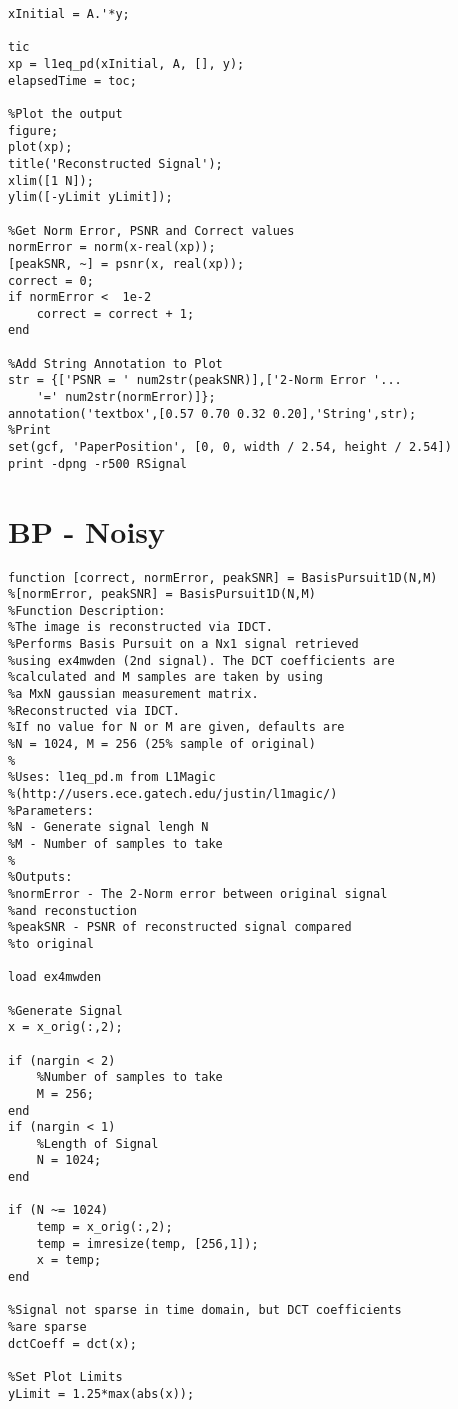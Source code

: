 \documentclass[titlepage,oneside, 12pt]{book}
\theoremstyle{break}
\begin{document}
\begin{appendices}
\begin{lstlisting}[label={lst:ex1D}]
%Do CS Recovery via l1 minimization.
xInitial = A.'*y; 

tic
xp = l1eq_pd(xInitial, A, [], y);
elapsedTime = toc;

%Plot the output
figure; 
plot(xp); 
title('Reconstructed Signal'); 
xlim([1 N]); 
ylim([-yLimit yLimit]);

%Get Norm Error, PSNR and Correct values
normError = norm(x-real(xp)); 
[peakSNR, ~] = psnr(x, real(xp));
correct = 0;
if normError <  1e-2
    correct = correct + 1;
end
    
%Add String Annotation to Plot
str = {['PSNR = ' num2str(peakSNR)],['2-Norm Error '...
    '=' num2str(normError)]}; 
annotation('textbox',[0.57 0.70 0.32 0.20],'String',str);
%Print
set(gcf, 'PaperPosition', [0, 0, width / 2.54, height / 2.54])
print -dpng -r500 RSignal
\end{lstlisting}

\chapter{BP - Noisy}
\begin{lstlisting}[label={lst:ex1DNoise}]
function [correct, normError, peakSNR] = BasisPursuit1D(N,M)
%[normError, peakSNR] = BasisPursuit1D(N,M)
%Function Description: 
%The image is reconstructed via IDCT.
%Performs Basis Pursuit on a Nx1 signal retrieved
%using ex4mwden (2nd signal). The DCT coefficients are
%calculated and M samples are taken by using 
%a MxN gaussian measurement matrix. 
%Reconstructed via IDCT. 
%If no value for N or M are given, defaults are
%N = 1024, M = 256 (25% sample of original)
%
%Uses: l1eq_pd.m from L1Magic 
%(http://users.ece.gatech.edu/justin/l1magic/)
%Parameters:
%N - Generate signal lengh N
%M - Number of samples to take
%
%Outputs:
%normError - The 2-Norm error between original signal 
%and reconstuction
%peakSNR - PSNR of reconstructed signal compared 
%to original

load ex4mwden

%Generate Signal
x = x_orig(:,2);

if (nargin < 2)
    %Number of samples to take
    M = 256;
end
if (nargin < 1)
    %Length of Signal 
    N = 1024;
end

if (N ~= 1024)
    temp = x_orig(:,2);
    temp = imresize(temp, [256,1]); 
    x = temp; 
end

%Signal not sparse in time domain, but DCT coefficients 
%are sparse
dctCoeff = dct(x); 

%Set Plot Limits
yLimit = 1.25*max(abs(x)); 


\end{lstlisting}
\end{appendices}
\end{document}
